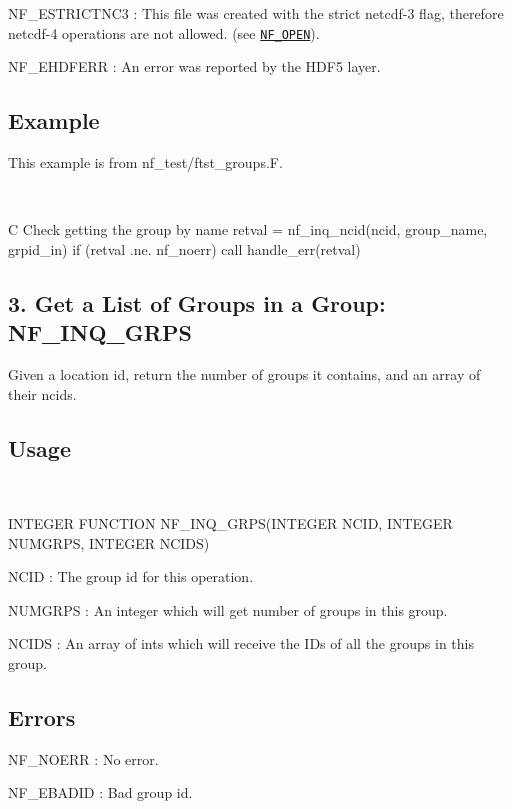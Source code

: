 {\ttfamily N\+F\+\_\+\+E\+S\+T\+R\+I\+C\+T\+N\+C3} \+: This file was created with the strict netcdf-\/3 flag, therefore netcdf-\/4 operations are not allowed. (see \href{#NF_005fOPEN}{\tt N\+F\+\_\+\+O\+P\+EN}).

{\ttfamily N\+F\+\_\+\+E\+H\+D\+F\+E\+RR} \+: An error was reported by the H\+D\+F5 layer.

\subsection*{Example }

This example is from nf\+\_\+test/ftst\+\_\+groups.\+F.

 

C Check getting the group by name retval = nf\+\_\+inq\+\_\+ncid(ncid, group\+\_\+name, grpid\+\_\+in) if (retval .ne. nf\+\_\+noerr) call handle\+\_\+err(retval)\hypertarget{nc_f77_interface_guide_f77_NF-INQ-GRPS}{}\subsection{3. Get a List of Groups in a Group\+: N\+F\+\_\+\+I\+N\+Q\+\_\+\+G\+R\+P\+S }\label{nc_f77_interface_guide_f77_NF-INQ-GRPS}
Given a location id, return the number of groups it contains, and an array of their ncids.

\subsection*{Usage }

 

I\+N\+T\+E\+G\+ER F\+U\+N\+C\+T\+I\+ON N\+F\+\_\+\+I\+N\+Q\+\_\+\+G\+R\+P\+S(\+I\+N\+T\+E\+G\+E\+R N\+C\+I\+D, I\+N\+T\+E\+G\+E\+R N\+U\+M\+G\+R\+P\+S, I\+N\+T\+E\+G\+E\+R N\+C\+I\+D\+S)

{\ttfamily N\+C\+ID} \+: The group id for this operation.

{\ttfamily N\+U\+M\+G\+R\+PS} \+: An integer which will get number of groups in this group.

{\ttfamily N\+C\+I\+DS} \+: An array of ints which will receive the I\+Ds of all the groups in this group.

\subsection*{Errors }

{\ttfamily N\+F\+\_\+\+N\+O\+E\+RR} \+: No error.

{\ttfamily N\+F\+\_\+\+E\+B\+A\+D\+ID} \+: Bad group id.

